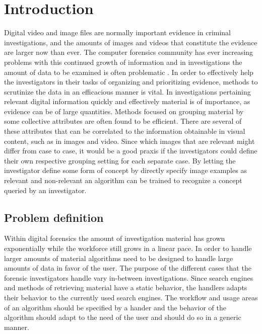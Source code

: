 \chapter{Introduction}
\label{chapter:intro}

Digital video and image files are normally important evidence in criminal investigations, and the amounts of images and videos that constitute the evidence are larger now than ever. The computer forensics community has ever increasing problems with this continued growth of information and in investigations the amount of data to be examined is often problematic \cite{dhs2011}\cite{proc2009forensics}\cite{proc2010forensics}. In order to effectively help the investigators in their tasks of organizing and prioritizing evidence, methods to scrutinize the data in an efficacious manner is vital. In investigations pertaining relevant digital information quickly and effectively material is of importance, as evidence can be of large quantities. Methods focused on grouping material by some collective attributes are often found to be efficient. There are several of these attributes that can be correlated to the information obtainable in visual content, such as in images and video. Since which images that are relevant might differ from case to case, it would be a good praxis if the investigators could define their own respective grouping setting for each separate case. By letting the investigator define some form of concept by directly specify image examples as relevant and non-relevant an algorithm can be trained to recognize a concept queried by an investigator.

\section{Problem definition}
Within digital forensics the amount of investigation material has grown exponentially while the workforce still grows in a linear pace. In order to handle larger amounts of material algorithms need to be designed to handle large amounts of data in favor of the user. The purpose of the different cases that the forensic investigators handle vary in-between investigations. Since search engines and methods of retrieving material have a static behavior, the handlers adapts their behavior to the currently used search engines. The workflow and usage areas of an algorithm should be specified by a hander and the behavior of the algorithm should adapt to the need of the user and should do so in a generic manner. 

